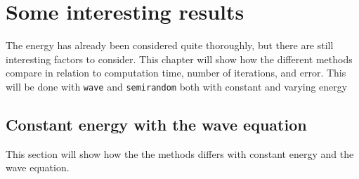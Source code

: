 \chapter{Some interesting results}
The energy has already been considered quite thoroughly, but there are still interesting factors to consider. This chapter will show how the different methods compare in relation to computation time, number of iterations, and error. This will be done with  \texttt{wave} and \texttt{semirandom} both with constant and varying energy


\section{Constant energy with the wave equation}
This section will show how the the methods differs with constant energy and the wave equation.



